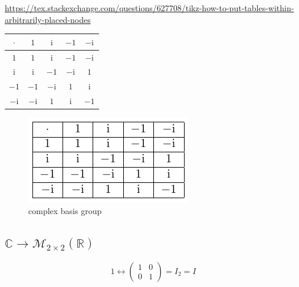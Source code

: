 \documentclass[
]{book}
\theoremstyle{definition}
\theoremstyle{definition}
\theoremstyle{definition}
\theoremstyle{definition}
\theoremstyle{remark}
\begin{document}
\url{https://tex.stackexchange.com/questions/627708/tikz-how-to-put-tables-within-arbitrarily-placed-nodes}

\begin{tabular}{|c|c|c|c|c|}
\hline 
$\cdot$ & $1$ & $\mathrm{i}$ & $-1$ & $-\mathrm{i}$\tabularnewline
\hline 
$1$ & $1$ & $\mathrm{i}$ & $-1$ & $-\mathrm{i}$\tabularnewline
\hline 
$\mathrm{i}$ & $\mathrm{i}$ & $-1$ & $-\mathrm{i}$ & $1$\tabularnewline
\hline 
$-1$ & $-1$ & $-\mathrm{i}$ & $1$ & $\mathrm{i}$\tabularnewline
\hline 
$-\mathrm{i}$ & $-\mathrm{i}$ & $1$ & $\mathrm{i}$ & $-1$\tabularnewline
\hline 
\end{tabular}

\begin{figure}
\centering
\includegraphics{202403281312-group-theory_files/figure-latex/unnamed-chunk-3-1.pdf}
\caption{\label{fig:unnamed-chunk-3}complex basis group}
\end{figure}

\subsection{\texorpdfstring{\(\mathbb{C}\rightarrow\mathcal{M}_{2\times2}\left(\mathbb{R}\right)\)}{\textbackslash mathbb\{C\}\textbackslash rightarrow\textbackslash mathcal\{M\}\_\{2\textbackslash times2\}\textbackslash left(\textbackslash mathbb\{R\}\textbackslash right)}}\label{mathbbcrightarrowmathcalm_2times2leftmathbbrright}

\[
1\leftrightarrow\begin{pmatrix}1 & 0\\
0 & 1
\end{pmatrix}=I_{2}=I
\]
\end{document}
